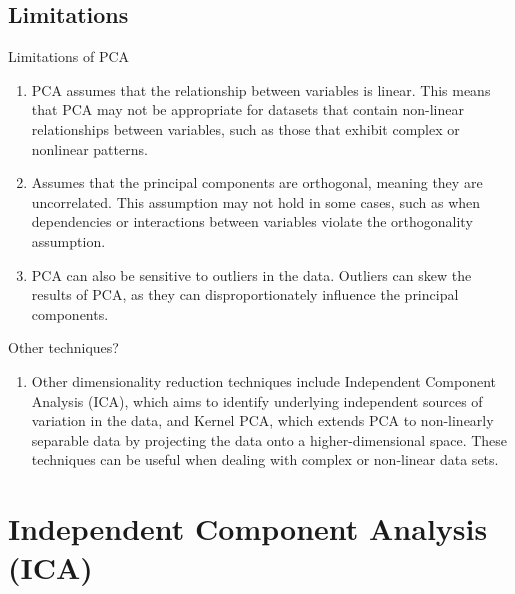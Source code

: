 \documentclass{beamer}
\begin{document}
\subsection{Limitations}
\begin{frame}{Limitations of PCA}
    \begin{enumerate}
        \item PCA assumes that the relationship between variables is linear. This means that PCA may not be appropriate for datasets that contain non-linear relationships between variables, such as those that exhibit complex or nonlinear patterns.
        \item Assumes that the principal components are orthogonal, meaning they are uncorrelated. This assumption may not hold in some cases, such as when dependencies or interactions between variables violate the orthogonality assumption.
        \item PCA can also be sensitive to outliers in the data. Outliers can skew the results of PCA, as they can disproportionately influence the principal components.
    \end{enumerate}
\end{frame}

\begin{frame}{Other techniques?}
    \begin{enumerate}
        \item Other dimensionality reduction techniques include Independent Component Analysis (ICA), which aims to identify underlying independent sources of variation in the data, and Kernel PCA, which extends PCA to non-linearly separable data by projecting the data onto a higher-dimensional space. These techniques can be useful when dealing with complex or non-linear data sets.
    \end{enumerate}
\end{frame}

\section{Independent Component Analysis (ICA)}
\end{document}
